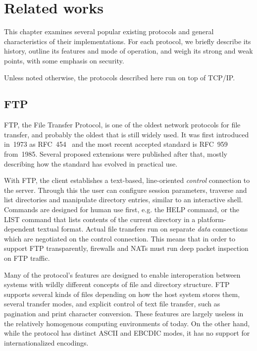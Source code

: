 
\chapter{Related works}

This chapter examines several popular existing protocols and general characteristics of their implementations.
For each protocol, we briefly describe its history, outline its features and mode of operation, and weigh its
strong and weak points, with some emphasis on security.

Unless noted otherwise, the protocols described here run on top of TCP/IP.

\section{FTP}

FTP, the File Transfer Protocol, is one of the oldest network protocols for file transfer, and probably the
oldest that is still widely used. It was first introduced in~1973 as RFC~454~\cite{rfc454} and the most recent
accepted standard is RFC~959~\cite{rfc959} from~1985. Several proposed extensions were published after that,
mostly describing how the standard has evolved in practical use.

With FTP, the client establishes a text-based, line-oriented {\it control} connection to the server. Through this
the user can configure session parameters, traverse and list directories and manipulate directory entries,
similar to an interactive shell. Commands are designed for human use first, e.g. the HELP command, or the LIST
command that lists contents of the current directory in a platform-dependent textual format. Actual file
transfers run on separate {\it data} connections which are negotiated on the control connection. This means
that in order to support FTP transparently, firewalls and NATs must run deep packet inspection on FTP traffic.

Many of the protocol's features are designed to enable interoperation between systems with wildly different
concepts of file and directory structure. FTP supports several kinds of files depending on how the host system
stores them, several transfer modes, and explicit control of text file transfer, such as pagination and print
character conversion. These features are largely useless in the relatively homogenous computing environments
of today. On the other hand, while the protocol has distinct ASCII and EBCDIC modes, it has no support for
internationalized encodings.

